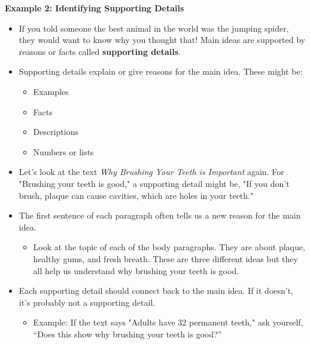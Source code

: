 \documentclass[12pt]{article}
\begin{document}
\begin{tcolorbox}[colframe=black!60, colback=white, 
coltitle=black, colbacktitle=black!15, fonttitle=\bfseries\Large, 
title=Examples, halign title=center, left=10pt, right=10pt, top=10pt, bottom=15pt]

\textbf{Example 2: Identifying Supporting Details}
\begin{itemize}
    
    \item If you told someone the best animal in the world was the jumping spider, they would want to know why you thought that! Main ideas are supported by reasons or facts called \textbf{supporting details}.
     
    \item Supporting details explain or give reasons for the main idea. These might be:
    
    \begin{itemize}
        \item Examples
    \end{itemize}
    \begin{itemize}
        \item Facts
    \end{itemize}
    \begin{itemize}
        \item Descriptions
    \end{itemize}
    \begin{itemize}
        \item Numbers or lists
    \end{itemize}

    \item Let's look at the text \textit{Why Brushing Your Teeth is Important} again. For "Brushing your teeth is good," a supporting detail might be, "If you don't brush, plaque can cause cavities, which are holes in your teeth."

    \item     The first sentence of each paragraph often tells us a new reason for the main idea. 
    \begin{itemize}
        \item Look at the topic of each of the body paragraphs. They are about plaque, healthy gums, and fresh breath. These are three different ideas but they all help us understand why brushing your teeth is good.
    \end{itemize}

    \item Each supporting detail should connect back to the main idea. If it doesn’t, it’s probably not a supporting detail.
    \begin{itemize}
        \item Example: If the text says "Adults have 32 permanent teeth," ask yourself, “Does this show why brushing your teeth is good?”
    \end{itemize}

\end{itemize}

     \end{tcolorbox}
\vspace{1em}
\end{document}
